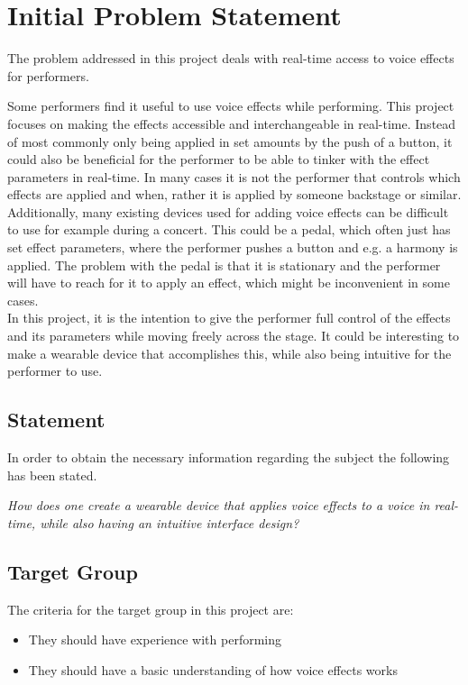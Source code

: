 \section{Initial Problem Statement}

The problem addressed in this project deals with real-time access to voice effects for performers. 

Some performers find it useful to use voice effects while performing. This project focuses on making the effects accessible and interchangeable in real-time. Instead of most commonly only being applied in set amounts by the push of a button, it could also be beneficial for the performer to be able to tinker with the effect parameters in real-time. In many cases it is not the performer that controls which effects are applied and when, rather it is applied by someone backstage or similar. \\

Additionally, many existing devices used for adding voice effects can be difficult to use for example during a concert. This could be a pedal, which often just has set  effect parameters, where the performer pushes a button and e.g. a harmony is applied. The problem with the pedal is that it is stationary and the performer will have to reach for it to apply an effect, which might be inconvenient in some cases.\\

In this project, it is the intention to give the performer full control of the effects and its parameters while moving freely across the stage. It could be interesting to make a wearable device that accomplishes this, while also being intuitive for the performer to use.


\subsection{Statement}
In order to obtain the necessary information regarding the subject the following has been stated.

\textit{How does one create a wearable device that applies voice effects to a voice in real-time, while also having an intuitive interface design?}


\subsection{Target Group}
The criteria for the target group in this project are:

\begin{itemize}
	\item They should have experience with performing
	\item They should have a basic understanding of how voice effects works
\end{itemize}

